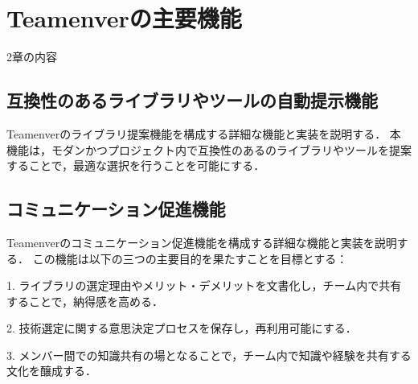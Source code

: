\documentclass[main]{subfiles}
\begin{document}
\section{Teamenverの主要機能}
2章の内容
\subsection{互換性のあるライブラリやツールの自動提示機能}
Teamenverのライブラリ提案機能を構成する詳細な機能と実装を説明する．
本機能は，モダンかつプロジェクト内で互換性のあるのライブラリやツールを提案することで，最適な選択を行うことを可能にする．
\subsection{コミュニケーション促進機能}
Teamenverのコミュニケーション促進機能を構成する詳細な機能と実装を説明する．
この機能は以下の三つの主要目的を果たすことを目標とする：

1.	ライブラリの選定理由やメリット・デメリットを文書化し，チーム内で共有することで，納得感を高める．

2.	技術選定に関する意思決定プロセスを保存し，再利用可能にする．

3.	メンバー間での知識共有の場となることで，チーム内で知識や経験を共有する文化を醸成する．
\end{document}
